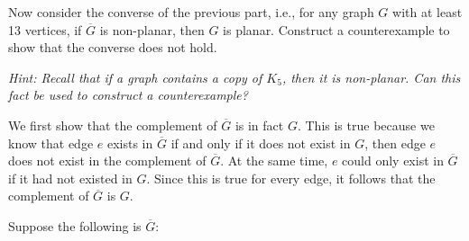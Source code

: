 \documentclass[11pt]{article}
\begin{document}
\begin{Parts}
\begin{solution}
\end{solution}

\Part Now consider the converse of the previous part, i.e., for any graph $G$ with at least 13 vertices, if $\overline{G}$ is non-planar, then $G$ is planar. Construct a counterexample to show that the converse does not hold.

\textit{Hint: Recall that if a graph contains a copy of $K_5$, then it is non-planar. Can this fact be used to construct a counterexample?}

    \begin{solution}
        We first show that the complement of $\overline G$ is in fact $G$. This is true because we know that edge $e$ exists in $\overline G$ if and only if it does not exist in $G$, then edge $e$ does not exist in the complement of $\overline G$. At the same time, $e$ could only exist in $\overline G$ if it had not existed in $G$. Since this is true for every edge, it follows that the complement of $\overline G$ is $G$.
        
        
        Suppose the following is $\overline G$:

        \begin{center}
        \end{center}


\end{solution}
\end{Parts}
\end{document}
